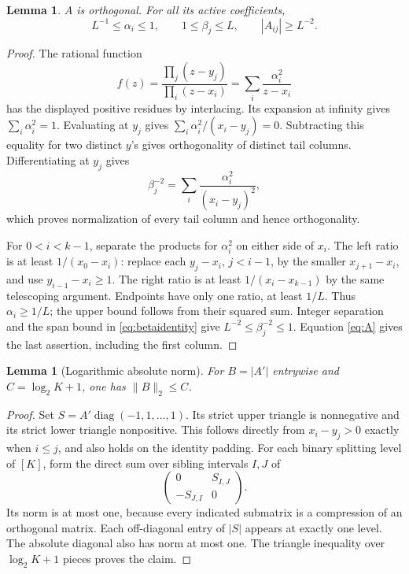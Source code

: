 \documentclass[11pt]{article}
\newtheorem{lemma}[theorem]{Lemma}
\theoremstyle{definition}
\newcommand{\norm}[1]{\lVert #1\rVert}
\newcommand{\diag}{\operatorname{diag}}
\begin{document}
\begin{lemma}\label{lem:residue}
$A$ is orthogonal. For all its active coefficients,
\[
 L^{-1}\le\alpha_i\le1,\qquad 1\le\beta_j\le L,
 \qquad |A_{ij}|\ge L^{-2}.
\]
\end{lemma}
\begin{proof}
The rational function
\[
 f(z)=\frac{\prod_j(z-y_j)}{\prod_i(z-x_i)}
      =\sum_i\frac{\alpha_i^2}{z-x_i}
\]
has the displayed positive residues by interlacing. Its expansion at
infinity gives $\sum_i\alpha_i^2=1$. Evaluating at $y_j$ gives
$\sum_i\alpha_i^2/(x_i-y_j)=0$. Subtracting this equality for two distinct
$y$'s gives orthogonality of distinct tail columns. Differentiating at
$y_j$ gives
\begin{equation}\label{eq:betaidentity}
 \beta_j^{-2}=\sum_i\frac{\alpha_i^2}{(x_i-y_j)^2},
\end{equation}
which proves normalization of every tail column and hence orthogonality.

For $0<i<k-1$, separate the products for $\alpha_i^2$ on either side
of $x_i$. The left ratio is at least $1/(x_0-x_i)$: replace each
$y_j-x_i$, $j<i-1$, by the smaller $x_{j+1}-x_i$, and use
$y_{i-1}-x_i\ge1$. The right ratio is at least
$1/(x_i-x_{k-1})$ by the same telescoping argument. Endpoints have
only one ratio, at least $1/L$. Thus $\alpha_i\ge1/L$; the upper bound
follows from their squared sum. Integer separation and the span bound
in \eqref{eq:betaidentity} give $L^{-2}\le\beta_j^{-2}\le1$.
Equation \eqref{eq:A} gives the last assertion, including the first column.
\end{proof}

\begin{lemma}[Logarithmic absolute norm]\label{lem:absnorm}
For $B=|A'|$ entrywise and $C=\log_2K+1$, one has $\norm B_2\le C$.
\end{lemma}
\begin{proof}
Set $S=A'\diag(-1,1,\ldots,1)$. Its strict upper triangle is nonnegative
and its strict lower triangle nonpositive. This follows directly from
$x_i-y_j>0$ exactly when $i\le j$, and also holds on the identity padding.
For each binary splitting level of $[K]$, form the direct sum over sibling
intervals $I,J$ of
\[
 \begin{pmatrix}0&S_{I,J}\\-S_{J,I}&0\end{pmatrix}.
\]
Its norm is at most one, because every indicated submatrix is a compression
of an orthogonal matrix. Each off-diagonal entry of $|S|$ appears at
exactly one level. The absolute diagonal also has norm at most one.
The triangle inequality over $\log_2K+1$ pieces proves the claim.
\end{proof}
\end{document}
